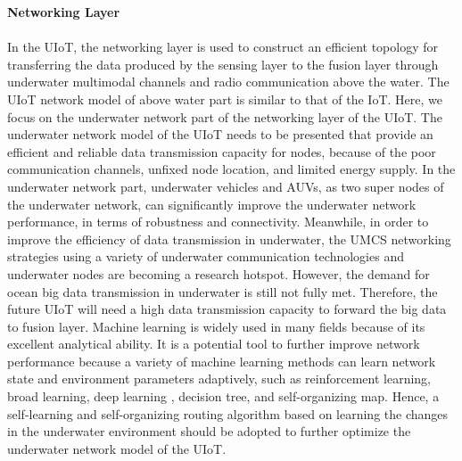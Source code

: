 \documentclass[a4paper,12pt]{article}
\begin{document}
\begin{multicols}{2}
\item\textbf{Networking Layer}\\
\\
In the UIoT, the networking layer is used to construct an efficient topology for transferring the data produced by the sensing layer to the fusion layer through underwater multimodal channels and radio communication above the water. The UIoT network model of above water part is similar to that of the IoT. Here, we focus on the underwater network part of the networking layer of the UIoT. The underwater network model of the UIoT needs to be presented that provide an efficient and reliable data transmission capacity for nodes, because of the poor communication channels, unfixed node location, and limited energy supply. In the underwater network part, underwater vehicles and AUVs, as two super nodes of the underwater network, can significantly improve the underwater network performance, in terms of robustness and connectivity. Meanwhile, in order to improve the efficiency of data transmission in underwater, the UMCS networking strategies using a variety of underwater communication technologies and underwater nodes are becoming a research hotspot. However, the demand for ocean big data transmission in underwater is still not fully met. Therefore, the future UIoT will need a high data transmission capacity to forward the big data to fusion layer. Machine learning is widely used in many fields because of its excellent analytical ability. It is a potential tool to further improve network performance because a variety of machine learning methods can learn network state and environment parameters adaptively, such as reinforcement learning, broad learning, deep learning , decision tree, and self-organizing map. Hence, a self-learning and self-organizing routing algorithm based on learning the changes in the underwater environment should be adopted to further optimize the underwater network model of the UIoT.
\\


\end{multicols}
\end{document}
